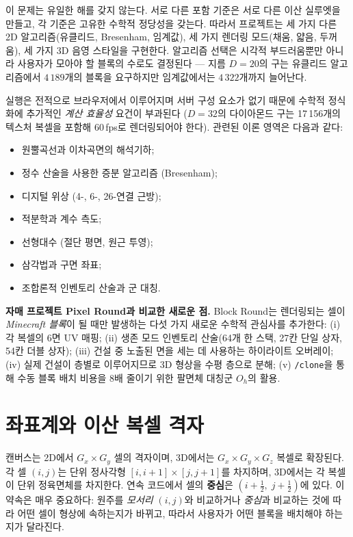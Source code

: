 \documentclass[12pt,a4paper]{scrartcl}
\newcommand{\acc}[1]{\textcolor{accent}{\textbf{#1}}}
\newcommand{\cmd}[1]{\textcolor{earth}{\texttt{\small #1}}}
\begin{document}
이 문제는 유일한 해를 갖지 않는다. 서로 다른 포함 기준은 서로 다른 이산 실루엣을 만들고, 각 기준은 고유한 수학적 정당성을 갖는다. 따라서 프로젝트는 세 가지 다른 2D 알고리즘(유클리드, Bresenham, 임계값), 세 가지 렌더링 모드(채움, 얇음, 두꺼움), 세 가지 3D 음영 스타일을 구현한다. 알고리즘 선택은 시각적 부드러움뿐만 아니라 사용자가 모아야 할 블록의 수로도 결정된다 — 지름 $D=20$의 구는 유클리드 알고리즘에서 $4\,189$개의 블록을 요구하지만 임계값에서는 $4\,322$개까지 늘어난다.

실행은 전적으로 브라우저에서 이루어지며 서버 구성 요소가 없기 때문에 수학적 정식화에 추가적인 \emph{계산 효율성} 요건이 부과된다 ($D=32$의 다이아몬드 구는 17\,156개의 텍스처 복셀을 포함해 60\,fps로 렌더링되어야 한다). 관련된 이론 영역은 다음과 같다:
\begin{itemize}[leftmargin=1.3em,itemsep=0.15em,topsep=0.3em]
  \item 원뿔곡선과 이차곡면의 해석기하;
  \item 정수 산술을 사용한 증분 알고리즘 (Bresenham);
  \item 디지털 위상 (4-, 6-, 26-연결 근방);
  \item 적분학과 계수 측도;
  \item 선형대수 (절단 평면, 원근 투영);
  \item 삼각법과 구면 좌표;
  \item 조합론적 인벤토리 산술과 군 대칭.
\end{itemize}

\textbf{자매 프로젝트 Pixel Round과 비교한 새로운 점.} Block Round는 렌더링되는 셀이 \emph{Minecraft 블록}이 될 때만 발생하는 다섯 가지 새로운 수학적 관심사를 추가한다: (i) 각 복셀의 6면 UV 매핑; (ii) 생존 모드 인벤토리 산술(64개 한 스택, 27칸 단일 상자, 54칸 더블 상자); (iii) 건설 중 노출된 면을 세는 데 사용하는 하이라이트 오버레이; (iv) 실제 건설이 층별로 이루어지므로 3D 형상을 수평 층으로 분해; (v) \cmd{/clone}을 통해 수동 블록 배치 비용을 $8$배 줄이기 위한 팔면체 대칭군 $O_h$의 활용.

\section{좌표계와 이산 복셀 격자}

캔버스는 2D에서 $G_x \times G_y$ 셀의 격자이며, 3D에서는 $G_x \times G_y \times G_z$ 복셀로 확장된다. 각 셀 $(i,j)$는 단위 정사각형 $[i, i+1] \times [j, j+1]$를 차지하며, 3D에서는 각 복셀이 단위 정육면체를 차지한다. 연속 코드에서 셀의 \acc{중심}은 $(i+\tfrac{1}{2},\; j+\tfrac{1}{2})$에 있다. 이 약속은 매우 중요하다: 원주를 \emph{모서리} $(i,j)$와 비교하거나 \emph{중심}과 비교하는 것에 따라 어떤 셀이 형상에 속하는지가 바뀌고, 따라서 사용자가 어떤 블록을 배치해야 하는지가 달라진다.
\end{document}
